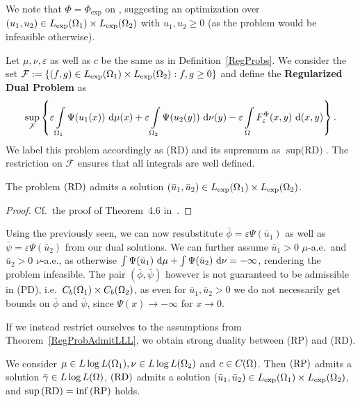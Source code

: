 We note that $\Phi = \Phi_{\exp}$ on \RZero, suggesting an optimization over ${(u_1, u_2)} \in \Lexp[\Omega_1] \times \Lexp[\Omega_2]$ with $u_1, u_2 \ge 0$ (as the problem would be infeasible otherwise).

\begin{definition}\label{RegDualProb}
	Let $\mu, \nu, \varepsilon$ as well as $c$ be the same as in Definition~\ref{RegProbs}. We consider the set $\mathcal{F} := \{ (f, g) \in \Lexp[\Omega_1] \times \Lexp[\Omega_2] : f, g \ge 0 \}$ and define the \textbf{Regularized Dual Problem} as
	\[ \sup\limits_{\mathcal{F}} \left\{ \varepsilon \int\limits_{\Omega_1} \Psi(u_1(x))~\Dx{\mu} + \varepsilon \int\limits_{\Omega_2} \Psi(u_2(y))~\Dx[y]{\nu} - \varepsilon \int\limits_{\Omega} F_{\varepsilon}^{\Phi}(x, y)~\Dx[x, y]{} \right\}. \]
	We label this problem accordingly as (RD) and its supremum as $\sup \text{(RD)}$. The restriction on $\mathcal{F}$ ensures that all integrals are well defined.
\end{definition}

\begin{lemma}\label{RegDualAdmit}
	The problem$\text{\normalfont\ (RD)}$ admits a solution $(\bar{u}_1, \bar{u}_2) \in \Lexp[\Omega_1] \times \Lexp[\Omega_2]$.
\end{lemma}

\begin{proof}
	Cf.~the proof of Theorem~4.6 in~\cite{Cla2021}.
\end{proof}

Using the previously seen, we can now resubstitute $\bar{\phi} = \varepsilon \Psi(\bar{u}_1)$ as well as $\bar{\psi} = \varepsilon \Psi(\bar{u}_2)$ from our dual solutions. We can further assume $\bar{u}_1 > 0$ $\mu$-a.e.\ and $\bar{u}_2 > 0$ $\nu$-a.e., as otherwise $\int \Psi(\bar{u}_1)~\D + \int \Psi(\bar{u}_2)~\D[\nu] = -\infty$, rendering the problem infeasible. The pair $(\bar{\phi}, \bar{\psi})$ however is not guaranteed to be admissible in (PD), i.e.~$\CF[b]{\Omega_1} \times \CF[b]{\Omega_2}$, as even for $\bar{u}_1, \bar{u}_2 > 0$ we do not necessarily get bounds on $\bar{\phi}$ and $\bar{\psi}$, since $\Psi(x) \rightarrow -\infty$ for $x \rightarrow 0$.

If we instead restrict ourselves to the assumptions from Theorem~\ref{RegProbAdmitLLL}, we obtain strong duality between (RP) and (RD).

\begin{theorem}\label{RegStrongDualityLLL}
	We consider $\mu \in \LLL[\Omega_1], \nu \in \LLL[\Omega_2]$ and $c \in \CF{\Omega}$. Then$\text{\normalfont\ (RP)}$ admits a solution $\bar{\gamma} \in \LLL$,$\text{\normalfont\ (RD)}$ admits a solution $(\bar{u}_1, \bar{u}_2) \in \Lexp[\Omega_1] \times \Lexp[\Omega_2]$, and $\sup\!\text{\normalfont\,(RD)} = \inf\!\text{\normalfont\,(RP)}$ holds.
\end{theorem}

